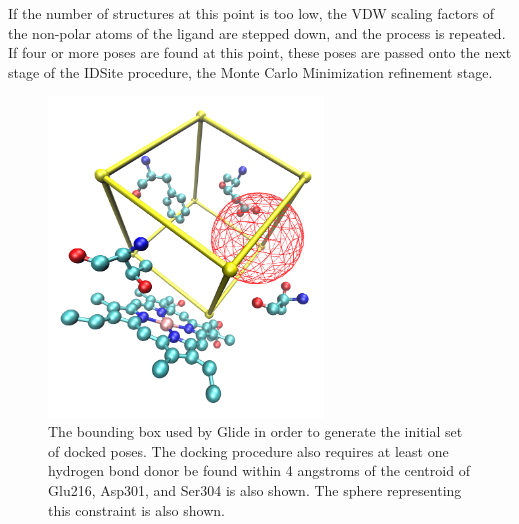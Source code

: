 If the number of structures at this point is too low, the VDW scaling factors of the non-polar atoms of the ligand are stepped down, and the process is repeated.
If four or more poses are found at this point, these poses are passed onto the next stage of the IDSite procedure, the Monte Carlo Minimization refinement stage.

\begin{figure}[h]
\centering
\includegraphics[width=0.65\textwidth]{figures/idsite/glide.png}
\caption{The bounding box used by Glide in order to generate the initial set of docked poses.
The docking procedure also requires at least one hydrogen bond donor be found within 4 angstroms of the centroid of Glu216, Asp301, and Ser304 is also shown.
The sphere representing this constraint is also shown.}
\label{fig:idsite_glide}
\end{figure}


